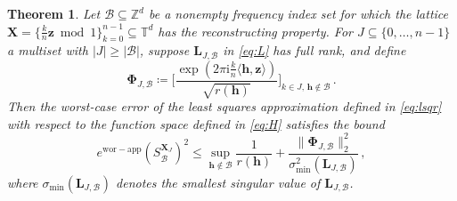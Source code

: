 \documentclass[a4paper]{amsart}
\newtheorem{theorem}{Theorem}[section]
\newcommand{\ewc}{e^{\mathrm{wor-app}}}
\newcommand{\modone}{\bmod{}1}
\begin{document}
\begin{theorem}\label{generalbound} Let $\mathcal B\subseteq\mathds Z^d$ be a nonempty frequency index set for which the lattice $\bm X = \{\frac kn\bm z\modone\}_{k=0}^{n-1} \subseteq\mathds T^d$ has the reconstructing property.
    For $J\subseteq\{0,\dots,n-1\}$ a multiset with $|J|\ge|\mathcal B|$, suppose $\bm L_{J,\mathcal B}$ in \eqref{eq:L} has full rank, and define
    \begin{equation}\label{eq:Phi}
        \bm\Phi_{J,\mathcal B}
        \coloneqq \Big[
        \frac{\exp(2\pi\mathrm i\frac{k}{n}\langle\bm h,\bm z\rangle)}{\sqrt{r(\bm h)}}
        \Big]_{k\in J,\,\bm h\notin\mathcal B} \,.
    \end{equation}
    Then the worst-case error of the least squares approximation defined in \eqref{eq:lsqr} with respect to the function space defined in \eqref{eq:H} satisfies the bound
    \begin{equation*}
        \ewc(S_{\mathcal B}^{\bm X_J})^2
        \le \sup_{\bm h\notin\mathcal B} \frac{1}{r(\bm h)}
        + 
        \frac{ \|\bm\Phi_{J,\mathcal B}\|_{2}^{2} }{ \sigma_{\min}^2(\bm L_{J,\mathcal B}) } \,,
    \end{equation*}
    where $\sigma_{\min}(\bm L_{J, \mathcal B})$ denotes the smallest singular value of $\bm L_{J,\mathcal B}$.
\end{theorem} 
\end{document}
